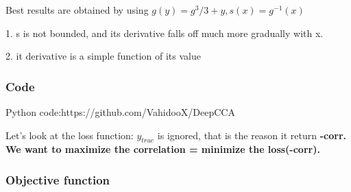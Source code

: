 \documentclass[a4paper]{article}
\begin{document}
Best results are obtained by using $g(y)=g^3/3+y, s(x)=g^{-1}(x)$

1. s is not bounded, and its derivative falls off much more gradually with x.

2. it derivative is a simple function of its value

\subsubsection{Code}
Python code:https://github.com/VahidooX/DeepCCA

Let's look at the loss function: $y_{true}$ is ignored, that is the
reason it return {\bf -corr. We want to maximize the correlation = minimize the loss(-corr).}

\subsubsection{Objective function}
\end{document}
